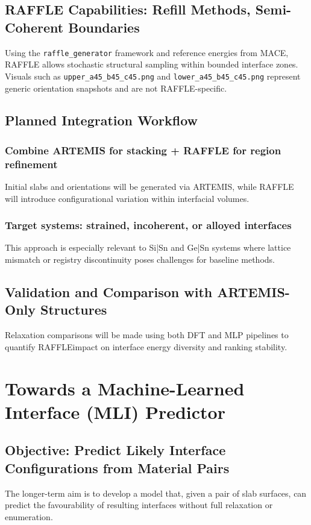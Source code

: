 \subsection{RAFFLE Capabilities: Refill Methods, Semi-Coherent Boundaries}
Using the \texttt{raffle\_generator} framework and reference energies from MACE, RAFFLE allows stochastic structural
sampling within bounded interface zones. Visuals such as \texttt{upper\_a45\_b45\_c45.png} and
\texttt{lower\_a45\_b45\_c45.png} represent generic orientation snapshots and are not RAFFLE-specific.

\subsection{Planned Integration Workflow}

\subsubsection{Combine ARTEMIS for stacking + RAFFLE for region refinement}
Initial slabs and orientations will be generated via ARTEMIS, while RAFFLE will introduce configurational variation
within interfacial volumes.

\subsubsection{Target systems: strained, incoherent, or alloyed interfaces}
This approach is especially relevant to Si|Sn and Ge|Sn systems where lattice mismatch or registry discontinuity poses
challenges for baseline methods.

\subsection{Validation and Comparison with ARTEMIS-Only Structures}
Relaxation comparisons will be made using both DFT and MLP pipelines to quantify RAFFLE\rqs impact on interface energy
diversity and ranking stability.


\section{Towards a Machine-Learned Interface (MLI) Predictor}

\subsection{Objective: Predict Likely Interface Configurations from Material Pairs}
The longer-term aim is to develop a model that, given a pair of slab surfaces, can predict the favourability of
resulting interfaces without full relaxation or enumeration.

